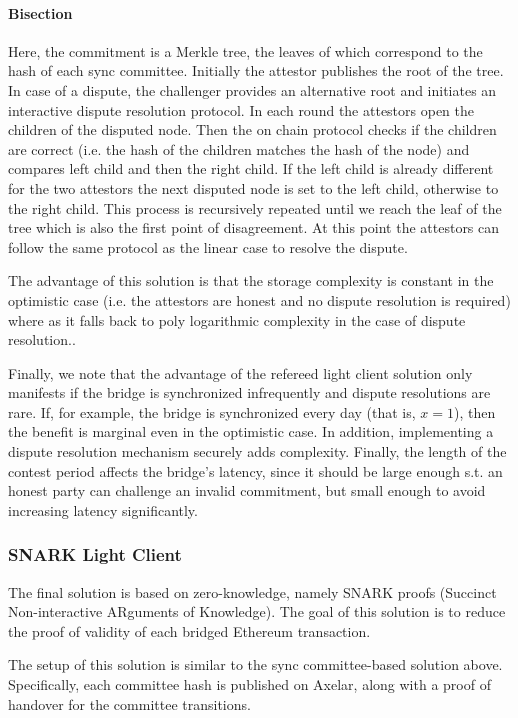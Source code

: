 \paragraph{Bisection}
Here, the commitment is a Merkle tree, the leaves of which correspond to the hash of each
sync committee. Initially the attestor publishes the root of the tree. In case of a dispute,
the challenger provides an alternative root and initiates an interactive dispute resolution
protocol. In each round the attestors open the children of the disputed node. Then the on chain
protocol checks if the children are correct (i.e. the hash of the children matches the hash of the node)
and compares left child and then the right child. If the left child is already different for 
the two attestors the next disputed node is set to the left child, otherwise to the right child.
This process is recursively repeated until we reach the leaf of the tree which is also the 
first point of disagreement. At this point the attestors can follow the same protocol as the linear
case to resolve the dispute. 

The advantage of this solution is that the storage complexity is constant in the optimistic case
(i.e. the attestors are honest and no dispute resolution is required) where as it falls back to 
poly logarithmic complexity in the case of dispute resolution.\cite{tas2022light,agrawal2023proofs}.

Finally, we note that the advantage of the refereed light client solution only
manifests if the bridge is synchronized infrequently and dispute resolutions
are rare. If, for example, the bridge is synchronized every day (that is, $x =
1$), then the benefit is marginal even in the optimistic case. In addition,
implementing a dispute resolution mechanism securely adds complexity. Finally,
the length of the contest period affects the bridge's latency, since it should
be large enough s.t. an honest party can challenge an invalid commitment, but
small enough to avoid increasing latency significantly.

\subsubsection{SNARK Light Client}

The final solution is based on zero-knowledge, namely SNARK proofs (Succinct
Non-interactive ARguments of Knowledge). The goal of this solution is to reduce
the proof of validity of each bridged Ethereum transaction.

The setup of this solution is similar to the sync committee-based solution
above. Specifically, each committee hash is published on Axelar, along with a proof
of handover for the committee transitions. 

